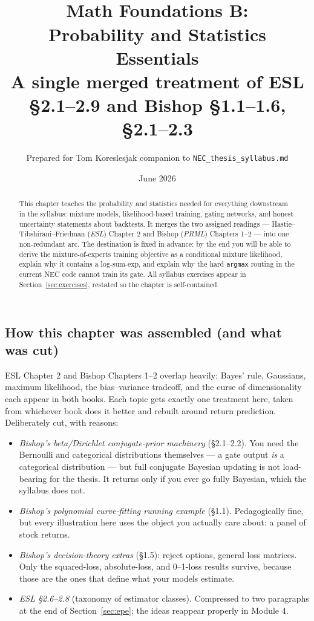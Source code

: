 \documentclass[11pt]{article}
\title{\vspace{-1.2em}{\large\sffamily Foundations for a Quant Research Pipeline}\\[0.4em]
\textbf{Math Foundations B:\\ Probability and Statistics Essentials}\\[0.3em]
{\large A single merged treatment of ESL \S2.1--2.9 and Bishop \S1.1--1.6, \S2.1--2.3}}
\author{Prepared for Tom Koreslesjak \;\textperiodcentered\; companion to \texttt{NEC\_thesis\_syllabus.md}}
\date{June 2026}
\numberwithin{equation}{section}
\theoremstyle{plain}
\theoremstyle{definition}
\theoremstyle{remark}
\newcounter{exercise}
\begin{document}
\maketitle
\vspace{-1.5em}

\begin{abstract}
\noindent This chapter teaches the probability and statistics needed for everything downstream in the syllabus: mixture models, likelihood-based training, gating networks, and honest uncertainty statements about backtests. It merges the two assigned readings --- Hastie--Tibshirani--Friedman (\emph{ESL}) Chapter 2 and Bishop (\emph{PRML}) Chapters 1--2 --- into one non-redundant arc. The destination is fixed in advance: by the end you will be able to derive the mixture-of-experts training objective as a conditional mixture likelihood, explain why it contains a log-sum-exp, and explain why the hard \texttt{argmax} routing in the current NEC code cannot train its gate. All syllabus exercises appear in Section~\ref{sec:exercises}, restated so the chapter is self-contained.
\end{abstract}

\tableofcontents

\subsection*{How this chapter was assembled (and what was cut)}

ESL Chapter 2 and Bishop Chapters 1--2 overlap heavily: Bayes' rule, Gaussians, maximum likelihood, the bias--variance tradeoff, and the curse of dimensionality each appear in both books. Each topic gets exactly one treatment here, taken from whichever book does it better and rebuilt around return prediction. Deliberately cut, with reasons:

\begin{itemize}[leftmargin=2em,itemsep=0.15em]
\item \emph{Bishop's beta/Dirichlet conjugate-prior machinery} (\S2.1--2.2). You need the Bernoulli and categorical distributions themselves --- a gate output \emph{is} a categorical distribution --- but full conjugate Bayesian updating is not load-bearing for the thesis. It returns only if you ever go fully Bayesian, which the syllabus does not.
\item \emph{Bishop's polynomial curve-fitting running example} (\S1.1). Pedagogically fine, but every illustration here uses the object you actually care about: a panel of stock returns.
\item \emph{Bishop's decision-theory extras} (\S1.5): reject options, general loss matrices. Only the squared-loss, absolute-loss, and 0--1-loss results survive, because those are the ones that define what your models estimate.
\item \emph{ESL \S2.6--2.8} (taxonomy of estimator classes). Compressed to two paragraphs at the end of Section~\ref{sec:epe}; the ideas reappear properly in Module 4.
\end{itemize}
\end{document}
